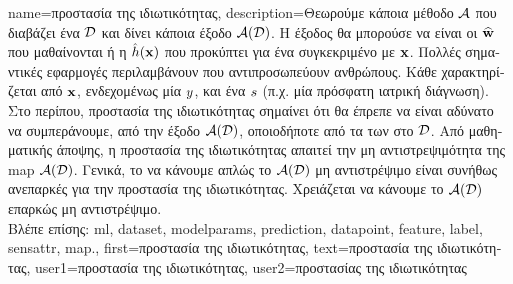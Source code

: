 {name={\foreignlanguage{greek}{προστασία της ιδιωτικότητας}},
     description={\foreignlanguage{greek}{Θεωρούμε κάποια μέθοδο}  $\mathcal{A}$ 
        		\foreignlanguage{greek}{που διαβάζει ένα} 
		 $\mathcal{D}$ \foreignlanguage{greek}{και δίνει κάποια έξοδο $\mathcal{A}(\mathcal{D})$. Η έξοδος 
		θα μπορούσε να είναι οι}  $\widehat{{\bf w}}$ \foreignlanguage{greek}{που μαθαί\-νονται ή η}  
		$\hat{h}({\bf x})$ \foreignlanguage{greek}{που προκύπτει για ένα συγκεκριμένο}  \foreignlanguage{greek}{με} 
		 ${\bf x}$. \foreignlanguage{greek}{Πολλές σημαντικές εφαρμογές}  
		\foreignlanguage{greek}{περιλαμβάνουν}  \foreignlanguage{greek}{που αντιπροσωπεύουν ανθρώπους. Κάθε} 
		 \foreignlanguage{greek}{χαρακτηρίζεται από}  ${\bf x}$, 
		\foreignlanguage{greek}{ενδεχομένως μία}  $y$, \foreignlanguage{greek}{και ένα}  $s$ 
		\foreignlanguage{greek}{(π.χ. μία πρόσφατη ιατρική διάγνωση). 
		Στο περίπου, προστασία της ιδιωτικότητας σημαίνει ότι θα έπρεπε να είναι αδύνατο να συμπεράνουμε, από την έξοδο $\mathcal{A}(\mathcal{D})$, 
		οποιοδήποτε από τα}  \foreignlanguage{greek}{των}  \foreignlanguage{greek}{στο} $\mathcal{D}$. 
		\foreignlanguage{greek}{Από μαθηματικής άποψης, η προστασία της ιδιωτικότητας απαιτεί την μη αντιστρεψιμότητα της} \gls{map}  
		$\mathcal{A}(\mathcal{D})$. \foreignlanguage{greek}{Γενικά, το να κάνουμε απλώς το $\mathcal{A}(\mathcal{D})$ μη αντιστρέψιμο 
		είναι συνήθως ανεπαρκές για την προστασία της ιδιωτικότητας. Χρειάζεται να κάνουμε το $\mathcal{A}(\mathcal{D})$ επαρκώς μη αντιστρέψιμο.}\\
		\foreignlanguage{greek}{Βλέπε επίσης:} \gls{ml}, \gls{dataset}, \glspl{modelparam}, \gls{prediction}, \gls{datapoint}, \gls{feature}, \gls{label}, \gls{sensattr}, \gls{map}.}, 
	first={\foreignlanguage{greek}{προστασία της ιδιωτικότητας}}, 
	text={\foreignlanguage{greek}{προστασία της ιδιωτικότητας}},
	user1={\foreignlanguage{greek}{προστασία της ιδιωτικότητας}}, %
   	user2={\foreignlanguage{greek}{προστασίας της ιδιωτικότητας}} %
}


